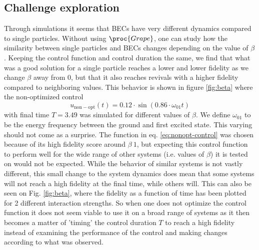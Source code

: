 \documentclass[a4paper, twocolumn]{revtex4-1}
\begin{document}
\subsection{Challenge exploration}\label{subsec:challenge_expl}
Through simulations it seems that BECs have very different dynamics compared to single particles. Without using $\proc{Grape}$, one can study how the similarity between single particles and BECs changes depending on the value of $\beta$. Keeping the control function and control duration the same, we find that what was a good solution for a single particle reaches a lower and lower fidelity as we change $\beta$ away from 0, but that it also reaches revivals with a higher fidelity compared to neighboring values. This behavior is shown in figure \ref{fig:beta} where the non-optimized control
\begin{equation}
	u_{\mathrm{non-opt}}(t)=0.12\cdot\sin(0.86\cdot \omega_{01} t)
	\label{eq:nonopt-control}
\end{equation} with final time $T=3.49$ was simulated for different values of $\beta$. We define $\omega_{01}$ to be the energy frequency between the ground and first excited state. This varying should not come as a surprise. The function in eq. \eqref{eq:nonopt-control} was chosen because of its high fidelity score around $\beta~1$, but expecting this control function to perform well for the wide range of other systems (i.e. values of $\beta$) it is tested on would not be expected. While the behavior of similar systems is not vastly different, this small change to the system dynamics does mean that some systems will not reach a high fidelity at the final time, while others will. This can also be seen on Fig. \ref{fig:beta}, where the fidelity as a function of time has been plotted for 2 different interaction strengths. So when one does not optimize the control function it does not seem viable to use it on a broad range of systems as it then becomes a matter of 'timing' the control duration $T$ to reach a high fidelity instead of examining the performance of the control and making changes according to what was observed.
\end{document}
